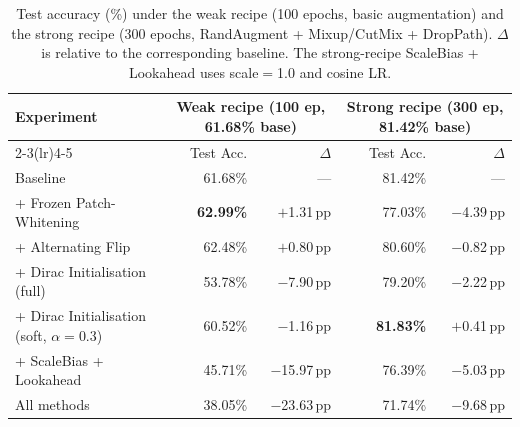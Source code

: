 \documentclass[10pt,twocolumn]{article}
\newcommand{\pp}{\,pp}   %
\newcommand{\methodA}{Frozen Patch-Whitening}
\newcommand{\methodB}{Dirac Initialisation}
\newcommand{\methodC}{ScaleBias + Lookahead}
\newcommand{\methodD}{Alternating Flip}
\begin{document}
\begin{table}[ht]
    \centering
    \begin{tabular}{lrrrr}
        \toprule
        \multirow{2}{*}{Experiment}
                                            & \multicolumn{2}{c}{Weak recipe (100 ep, 61.68\% base)}
                                            & \multicolumn{2}{c}{Strong recipe (300 ep, 81.42\% base)}                                                   \\
        \cmidrule(lr){2-3}\cmidrule(lr){4-5}
                                            & Test Acc.                                                & $\Delta$      & Test Acc.        & $\Delta$     \\
        \midrule
        Baseline                            & 61.68\%                                                  & ---           & 81.42\%          & ---          \\
        \midrule
        + \methodA{}                        & \textbf{62.99\%}                                         & $+$1.31\pp{}  & 77.03\%          & $-$4.39\pp{} \\
        + \methodD{}                        & 62.48\%                                                  & $+$0.80\pp{}  & 80.60\%          & $-$0.82\pp{} \\
        + \methodB{} (full)                 & 53.78\%                                                  & $-$7.90\pp{}  & 79.20\%          & $-$2.22\pp{} \\
        + \methodB{} (soft, $\alpha{=}0.3$) & 60.52\%                                                  & $-$1.16\pp{}  & \textbf{81.83\%} & $+$0.41\pp{} \\
        + \methodC{}                        & 45.71\%                                                  & $-$15.97\pp{} & 76.39\%          & $-$5.03\pp{} \\
        \midrule
        All methods                         & 38.05\%                                                  & $-$23.63\pp{} & 71.74\%          & $-$9.68\pp{} \\
        \bottomrule
    \end{tabular}
    \caption{Test accuracy (\%) under the weak recipe (100 epochs, basic augmentation) and
        the strong recipe (300 epochs, RandAugment + Mixup/CutMix + DropPath).
        $\Delta$ is relative to the corresponding baseline.
        The strong-recipe \methodC{} uses scale$=$1.0 and cosine LR.}
    \label{tab:results}
\end{table}
\end{document}
